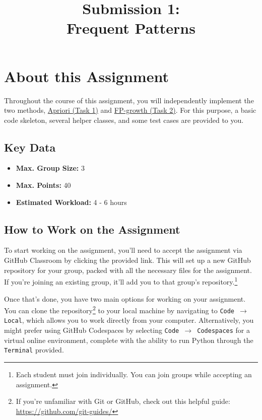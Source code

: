 \documentclass[
english,
smallborders
]{i6prcsht}
\begin{document}
\title{Submission 1: \\ Frequent Patterns}
\maketitle
\vspace*{-2cm}

\section*{About this Assignment}

Throughout the course of this assignment, you will independently implement the two methods, \hyperref[sec:task-one]{Apriori (Task 1)} and \hyperref[sec:task-two]{FP-growth (Task 2)}. For this purpose, a basic code skeleton, several helper classes, and some test cases are provided to you.

\subsection*{Key Data}

\begin{itemize}
	\item \textbf{Max. Group Size:} 3
	\item \textbf{Max. Points:} 40
	\item \textbf{Estimated Workload:} 4 - 6 hours
\end{itemize}

\subsection*{How to Work on the Assignment}

To start working on the assignment, you'll need to accept the assignment via GitHub Classroom by clicking the provided link. This will set up a new GitHub repository for your group, packed with all the necessary files for the assignment. If you're joining an existing group, it'll add you to that group's repository.\footnote{Each student must join individually. You can join groups while accepting an assignment.}

Once that's done, you have two main options for working on your assignment. You can clone the repository\footnote{If you're unfamiliar with Git or GitHub, check out this helpful guide: \url{https://github.com/git-guides/}} to your local machine by navigating to \texttt{Code $\rightarrow$ Local}, which allows you to work directly from your computer. Alternatively, you might prefer using GitHub Codespaces by selecting \texttt{Code $\rightarrow$ Codespaces} for a virtual online environment, complete with the ability to run Python through the \texttt{Terminal} provided.
\end{document}

